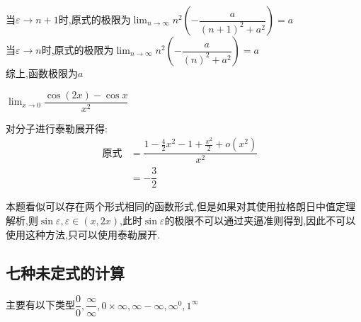 \documentclass[8pt a4paper, oneside, UTF8]{ctexbook}
\begin{document}
\begin{sloppypar}
\begin{solution}
        当$\varepsilon \to n+1$时,原式的极限为$\lim_{n\to \infty} n^2(-\dfrac{a}{(n+1)^2+a^2})=a$\\
        当$\varepsilon \to n$时,原式的极限为$\lim_{n\to \infty}n^2(-\dfrac{a}{(n)^2+a^2})=a$\\
        综上,函数极限为$a$
    \end{solution}
    \begin{problem}
        $\lim_{x\to 0}\dfrac{\cos(2x)-\cos x}{x^2}$
    \end{problem}
    \begin{solution}
        对分子进行泰勒展开得:
        \begin{align*}
            \text{原式} & = \dfrac{1-\frac{4}{2}x^2-1+\frac{x^2}{2}+o(x^2)}{x^2} & \\
            & = -\dfrac{3}{2}
        \end{align*}
    \end{solution}
    \begin{note}
        本题看似可以存在两个形式相同的函数形式,但是如果对其使用拉格朗日中值定理解析,则$\sin \varepsilon,\varepsilon \in (x,2x)$,此时$\sin \varepsilon$的极限不可以通过夹逼准则得到,因此不可以使用这种方法,只可以使用泰勒展开.
    \end{note}
    \subsection{七种未定式的计算}
    主要有以下类型$\dfrac{0}{0},\dfrac{\infty}{\infty},0 \times \infty,\infty -\infty,\infty ^0,1^\infty$

\end{sloppypar}
\end{document}
